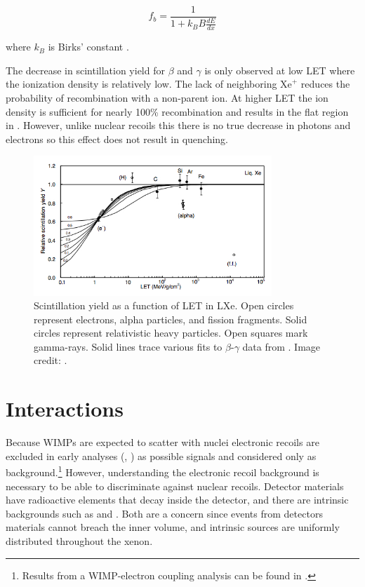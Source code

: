 \begin{equation}
f_{b} = \frac{1}{1 + k_B B \frac{dE}{dx}}
\label{eq:nr_scint_quench}
\end{equation}

\noindent where $k_B$ is Birks' constant .

The decrease in scintillation yield for $\beta$ and $\gamma$ is only observed at low LET where the ionization density is relatively
low.  The
lack of neighboring $\mathrm{Xe}^{+}$ reduces the probability of recombination with a non-parent ion.  At higher LET the ion density
is sufficient for nearly 100\% recombination and results in the flat region in .  However, unlike nuclear
recoils this there is no true decrease in photons and electrons so this effect does not result in quenching.

\begin{figure}
\includegraphics[width=0.8\textwidth]{ScintillationYield}
\caption[Scintillation yield as a function of LET in LXe for electrons, alpha particles, fission fragments, relativistic heavy particles, and
$\gamma$-rays.]{Scintillation yield as a function of LET in LXe.  Open circles represent electrons, alpha particles, and fission
fragments.  Solid circles represent relativistic heavy particles.  Open squares mark gamma-rays.  Solid lines trace various fits
to $\beta$-$\gamma$ data from .  Image credit: .}
\label{fig:scintillation_yield}
\end{figure}



\section{Interactions}
\label{sec:interactions}
Because WIMPs are expected to scatter with nuclei electronic recoils are excluded in early analyses (,
) as possible signals and considered only as background.\footnote{Results from a WIMP-electron coupling analysis can
be found in .}  However, understanding the electronic recoil background is necessary to be able to discriminate
against nuclear recoils.  Detector materials have radioactive elements that decay inside the detector, and there are intrinsic
backgrounds such as \krypton and \radon.  Both are a concern since events from
detectors materials cannot breach the inner volume, and intrinsic sources are uniformly distributed throughout the xenon.

